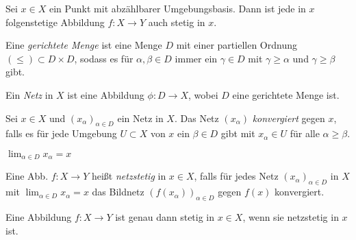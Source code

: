 \documentclass{cheat-sheet}
\begin{document}
\begin{prop}
  Sei $x \in X$ ein Punkt mit abzählbarer Umgebungsbasis. Dann ist jede in $x$ folgenstetige Abbildung $f : X \to Y$ auch stetig in $x$.
\end{prop}

\begin{defn}
  Eine \emph{gerichtete Menge} ist eine Menge $D$ mit einer partiellen Ordnung $(\le) \subset D \times D$, sodass es für $\alpha, \beta \in D$ immer ein $\gamma \in D$ mit $\gamma \geq \alpha$ und $\gamma \geq \beta$ gibt.
\end{defn}

\begin{defn}
  Ein \emph{Netz} in $X$ ist eine Abbildung $\phi : D \to X$, wobei $D$ eine gerichtete Menge ist.
\end{defn}

\iffalse
\begin{bspe}
  \begin{itemize}
    \item $D = (\N, \leq)$
    \item $X$ beliebige Menge, $D = (\mathcal{P}(X), \subseteq)$ oder $D = (\mathcal{P}(X), \supseteq)$
    \item Sei $(X, \tau)$ ein top. Raum, $x \in X$, $D \coloneqq (\Set{U \subset X}{\text{$U$ Umgebung von $x$}}, \leq)$ mit $U \leq V \coloneqq V \subset U$.
  \end{itemize}
\end{bspe}
\fi

\begin{defn}
  Sei $x \in X$ und $(x_\alpha)_{\alpha \in D}$ ein Netz in $X$. Das Netz $(x_\alpha)$ \emph{konvergiert} gegen $x$, falls es für jede Umgebung $U \subset X$ von $x$ ein $\beta \in D$ gibt mit $x_\alpha \in U$ für alle $\alpha \geq \beta$.
\end{defn}

\begin{nota}
  $\lim_{\alpha \in D} x_\alpha = x$
\end{nota}

\begin{defn}
  Eine Abb. $f : X \to Y$ heißt \emph{netzstetig} in $x \in X$, falls für jedes Netz $(x_\alpha)_{\alpha \in D}$ in $X$ mit $\lim_{\alpha \in D} x_\alpha = x$ das Bildnetz $(f(x_\alpha))_{\alpha \in D}$ gegen $f(x)$ konvergiert.
\end{defn}

\begin{prop}
  Eine Abbildung $f : X \to Y$ ist genau dann stetig in $x \in X$, wenn sie netzstetig in $x$ ist.
\end{prop}
\end{document}
